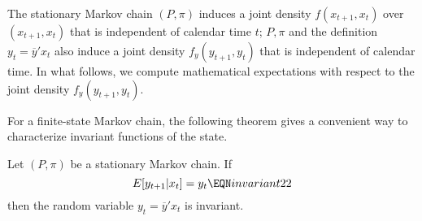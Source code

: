 %
%
%
%




The stationary Markov chain $(P, \pi)$ induces a joint density $f(x_{t+1}, x_t)$ over $(x_{t+1}, x_t)$ that
is independent of calendar time $t$; $P, \pi$ and the definition $y_t = \overline y' x_t$ also
induce a joint density $f_y(y_{t+1}, y_t)$ that is independent of calendar time.  In what follows,
we compute mathematical expectations with respect to the joint density $f_y(y_{t+1}, y_t)$.

For a finite-state Markov chain, the following theorem gives a convenient
way to characterize
invariant        functions of the state.

\medskip
{}  Let $(P, \pi)$ be a stationary Markov chain. %
If
$$ E [y_{t+1} | x_t] = y_t \EQN invariant22 $$
then the random variable   $y_t = \overline y' x_t$
is invariant.
\endtheorem


